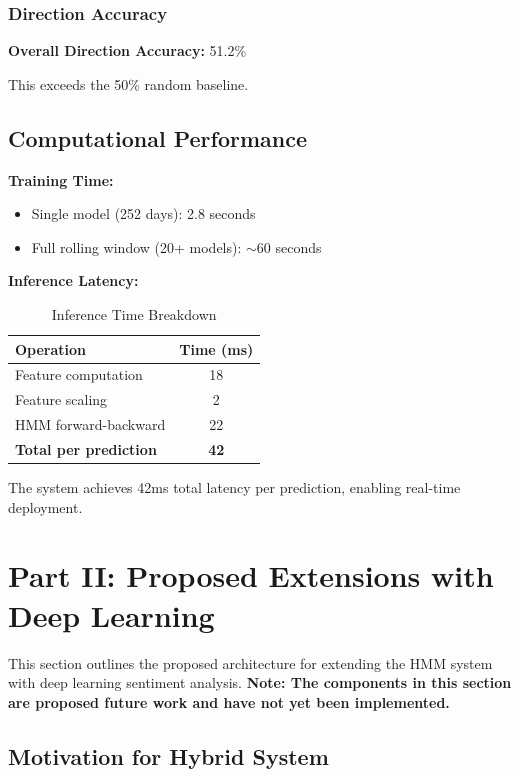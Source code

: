 \documentclass[conference]{IEEEtran}
\begin{document}
\subsubsection{Direction Accuracy}
\textbf{Overall Direction Accuracy:} 51.2\%

This exceeds the 50\% random baseline.

\subsection{Computational Performance}

\textbf{Training Time:}
\begin{itemize}
\item Single model (252 days): 2.8 seconds
\item Full rolling window (20+ models): $\sim$60 seconds
\end{itemize}

\textbf{Inference Latency:}
\begin{table}[htbp]
\centering
\caption{Inference Time Breakdown}
\label{tab:inference_time}
\begin{tabular}{lc}
\toprule
\textbf{Operation} & \textbf{Time (ms)} \\
\midrule
Feature computation & 18 \\
Feature scaling & 2 \\
HMM forward-backward & 22 \\
\textbf{Total per prediction} & \textbf{42} \\
\bottomrule
\end{tabular}
\end{table}

The system achieves 42ms total latency per prediction, enabling real-time deployment.

\section{Part II: Proposed Extensions with Deep Learning}

This section outlines the proposed architecture for extending the HMM system with deep learning sentiment analysis. \textbf{Note: The components in this section are proposed future work and have not yet been implemented.}

\subsection{Motivation for Hybrid System}
\end{document}
